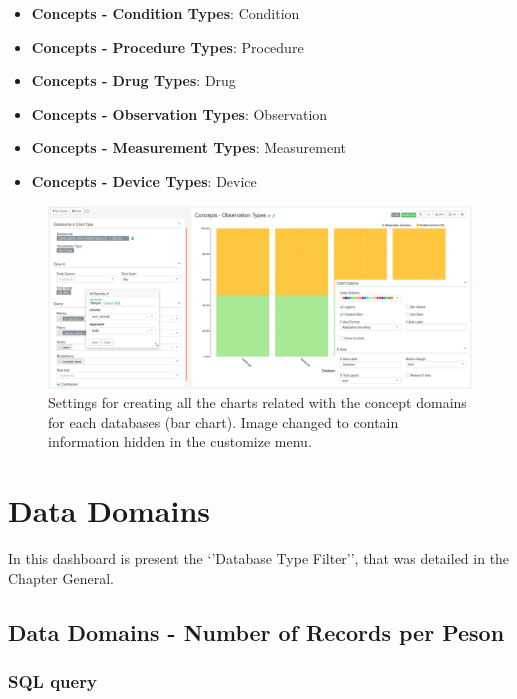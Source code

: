 \documentclass[]{book}
\providecommand{\tightlist}{%
  \setlength{\itemsep}{0pt}\setlength{\parskip}{0pt}}
\begin{document}
\begin{itemize}
  \begin{itemize}
  \tightlist
  \item
    \textbf{Concepts - Condition Types}: Condition
  \item
    \textbf{Concepts - Procedure Types}: Procedure
  \item
    \textbf{Concepts - Drug Types}: Drug
  \item
    \textbf{Concepts - Observation Types}: Observation
  \item
    \textbf{Concepts - Measurement Types}: Measurement
  \item
    \textbf{Concepts - Device Types}: Device
  \end{itemize}
\end{itemize}

\begin{figure}
\includegraphics[width=1\linewidth]{images/conceptsDomainTypes} \caption{Settings for creating all the charts related with the concept domains for each databases (bar chart). Image changed to contain information hidden in the customize menu.}\label{fig:conceptsDomainTypes}
\end{figure}

\chapter{Data Domains}\label{data-domains}

In this dashboard is present the `'Database Type Filter'', that was
detailed in the Chapter General.

\section{Data Domains - Number of Records per
Peson}\label{data-domains---number-of-records-per-peson}

\subsection{SQL query}\label{sql-query-18}
\end{document}
